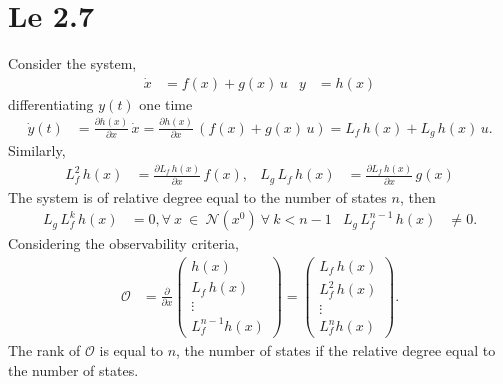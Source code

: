 \section{Le 2.7}
Consider the system,
\begin{align*}
    \dot x &= f(x) + g(x)\,u & y &= h(x)
\end{align*}
differentiating $y(t)$ one time 
\begin{align*}
    \dot y(t) &= \frac{\partial h(x)}{\partial x}\,\dot x = \frac{\partial h(x)}{\partial x}\,\left(f(x) + g(x)\,u\right) = L_f\,h(x) + L_g\,h(x)\,u.
\end{align*}
Similarly, 
\begin{align*}
    L_f^2\,h(x) &= \frac{\partial L_f\,h(x)}{\partial x}\,f(x), & L_g\,L_f\,h(x) &= \frac{\partial L_f\,h(x)}{\partial x}\,g(x)
\end{align*}
The system is of relative degree equal to the number of states $n$, then 
\begin{align*}
    L_g\,L_f^k\,h(x) &= 0, \forall\ x\ \in\ \mathcal{N}(x^0)\ \forall\ k < n - 1 & L_g\,L_f^{n-1}\,h(x) &\neq 0.
\end{align*}
Considering the observability criteria, 
\begin{align*}
    \mathcal{O} &= \frac{\partial}{\partial x}\begin{pmatrix} 
        h(x) \\ L_f\,h(x) \\ \vdots \\ L_f^{n-1}h(x) 
    \end{pmatrix} = \begin{pmatrix}
        L_f\,h(x) \\ L_f^2\,h(x) \\ \vdots \\ L_f^{n}h(x) 
    \end{pmatrix}.
\end{align*}
The rank of $\mathcal{O}$ is equal to $n$, the number of states if the relative degree equal to the number of states.
